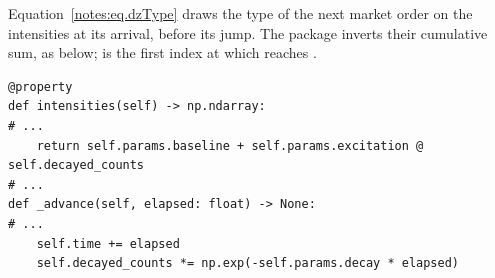 \begin{question}
\label{question.typeDrawnBeforeTheDecay}
Equation~\eqref{notes:eq.dzType} draws the type of the next market order
on the intensities at its arrival, before its jump.
The package inverts their cumulative sum, as below;
 is the first index
at which  reaches .
\begin{lstlisting}[caption={\protect\codehl{unito26.lob.hawkes.\_HawkesState}: the intensities, the decay and the type draw, their docstrings elided.}, label=listing.typeDrawState]
@property
def intensities(self) -> np.ndarray:
# ...
    return self.params.baseline + self.params.excitation @ self.decayed_counts
# ...
def _advance(self, elapsed: float) -> None:
# ...
    self.time += elapsed
    self.decayed_counts *= np.exp(-self.params.decay * elapsed)


\end{lstlisting}
\end{question}
